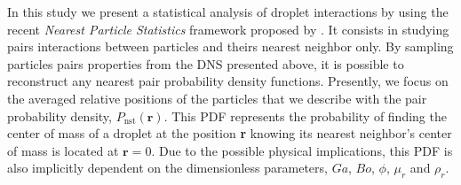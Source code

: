 \documentclass[9pt,a4paper]{article}
\begin{document}
In this study we present a statistical analysis of droplet interactions by using the recent \textit{Nearest Particle Statistics} framework proposed by \cite{zhang2021ensemble}. 
It consists in studying pairs interactions between particles and theirs nearest neighbor only. 
By sampling particles pairs properties from the DNS presented above, it is possible to reconstruct any nearest pair probability density functions. 
Presently, we focus on the averaged relative positions of the particles that we describe with the pair probability density, $P_\text{nst}(\textbf{r})$.
This PDF represents the probability of finding the center of mass of a droplet at the position \textbf{r} knowing its nearest neighbor's center of mass is located at $\textbf{r}=0$. 
Due to the possible physical implications, this PDF is also implicitly dependent on the dimensionless parameters, $Ga$, $Bo$, $\phi$, $\mu_r$ and $\rho_r$.
\end{document}
